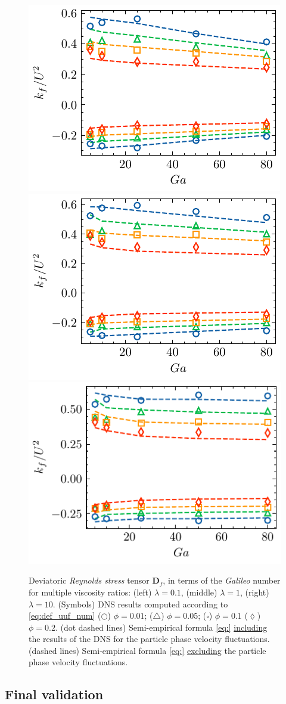 \begin{figure}
    \centering
    \includegraphics[height = 0.25\textwidth]{image/HOMOGENEOUS_final/CA/D2_l_0.pdf}
    \includegraphics[height = 0.25\textwidth]{image/HOMOGENEOUS_final/CA/D2_l_1.pdf}
    \includegraphics[height = 0.25\textwidth]{image/HOMOGENEOUS_final/CA/D2_l_10.pdf}
    \caption{Deviatoric \textit{Reynolds stress} tensor $\textbf{D}_f$, in terms of the \textit{Galileo} number for multiple viscosity ratios:
    (left) $\lambda = 0.1$,
    (middle) $\lambda = 1$,
    (right) $\lambda = 10$. 
    (Symbols) DNS results computed according to \ref{eq:def_uuf_num}
    ($\pmb\bigcirc$) $\phi = 0.01$; ($\pmb\triangle$) $ \phi = 0.05$; ($\pmb\square$) $\phi = 0.1$ ($\pmb\lozenge$) $\phi = 0.2$.
    (dot dashed lines) Semi-empirical formula \ref{eq:} \underline{including} the results of the DNS for the particle phase velocity fluctuations. 
    (dashed lines) Semi-empirical formula \ref{eq:} \underline{excluding} the particle phase velocity fluctuations. 
    }
    \label{fig:bf}
\end{figure}







\subsection{Final validation}


